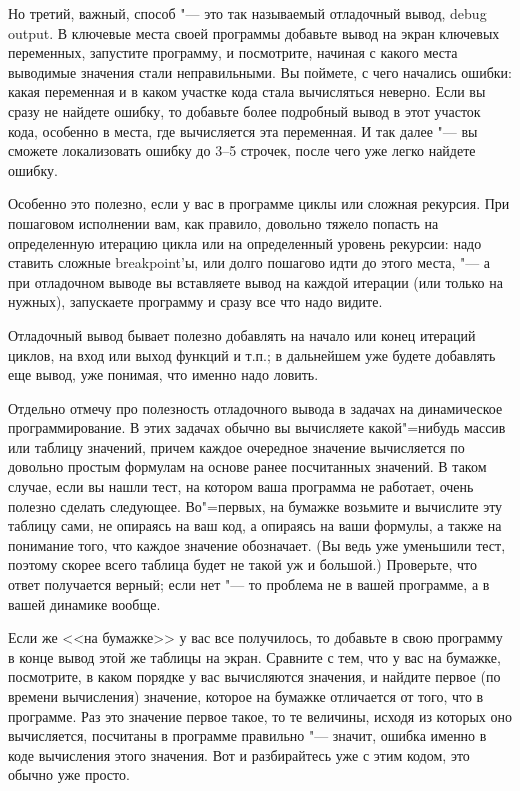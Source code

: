 \documentclass[a4paper,10pt]{problems}
\begin{document}
Но третий, важный, способ "--- это так называемый отладочный вывод, debug output. 
В ключевые места своей программы добавьте вывод на экран ключевых переменных, запустите программу, и посмотрите, 
начиная с какого места выводимые значения стали неправильными.
Вы поймете, с чего начались ошибки: какая переменная и в каком участке кода стала вычисляться неверно. 
Если вы сразу не найдете ошибку, то добавьте более подробный вывод в этот участок кода, особенно в места, где вычисляется эта переменная.
И так далее "--- вы сможете локализовать ошибку до 3--5 строчек, после чего уже легко найдете ошибку.

Особенно это полезно, если у вас в программе циклы или сложная рекурсия. 
При пошаговом исполнении вам, как правило, довольно тяжело попасть на определенную итерацию цикла или на определенный уровень рекурсии:
надо ставить сложные breakpoint'ы, или долго пошагово идти до этого места, "--- а при отладочном выводе вы вставляете вывод на каждой итерации
(или только на нужных), запускаете программу и сразу все что надо видите.

Отладочный вывод бывает полезно добавлять на начало или конец итераций циклов, на вход или выход функций и т.п.; 
в дальнейшем уже будете добавлять еще вывод, уже понимая, что именно надо ловить.

Отдельно отмечу про полезность отладочного вывода в задачах на динамическое программирование.
В этих задачах обычно вы вычисляете какой"=нибудь массив или таблицу значений, причем каждое очередное значение вычисляется по довольно простым формулам
на основе ранее посчитанных значений. 
В таком случае, если вы нашли тест, на котором ваша программа не работает, очень полезно сделать следующее.
Во"=первых, на бумажке возьмите и вычислите эту таблицу сами, не опираясь на ваш код, а опираясь на ваши формулы,
а также на понимание того, что каждое значение обозначает. 
(Вы ведь уже уменьшили тест, поэтому скорее всего таблица будет не такой уж и большой.)
Проверьте, что ответ получается верный; если нет "--- то проблема не в вашей программе, а в вашей динамике вообще.

Если же <<на бумажке>> у вас все получилось, то добавьте в свою программу в конце вывод этой же таблицы на экран.
Сравните с тем, что у вас на бумажке, посмотрите, в каком порядке у вас вычисляются значения, и найдите первое (по времени вычисления) значение,
которое на бумажке отличается от того, что в программе. 
Раз это значение первое такое, то те величины, исходя из которых оно вычисляется, посчитаны в программе правильно "--- значит, 
ошибка именно в коде вычисления этого значения. 
Вот и разбирайтесь уже с этим кодом, это обычно уже просто.
\end{document}
